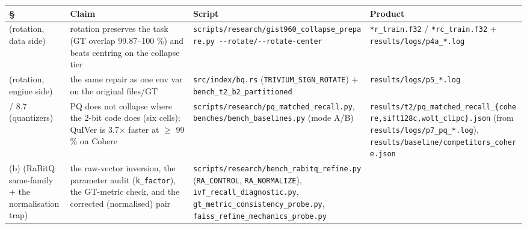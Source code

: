 \documentclass[
  10pt,
]{article}
\newcounter{none} %
\begin{document}
{\def\LTcaptype{none} %
\begin{longtable}[]{@{}
  >{\raggedright\arraybackslash}p{}
  >{\raggedright\arraybackslash}p{}
  >{\raggedright\arraybackslash}p{}
  >{\raggedright\arraybackslash}p{}@{}}
\toprule\noalign{}
\begin{minipage}[b]{\linewidth}\raggedright
§
\end{minipage} & \begin{minipage}[b]{\linewidth}\raggedright
Claim
\end{minipage} & \begin{minipage}[b]{\linewidth}\raggedright
Script
\end{minipage} & \begin{minipage}[b]{\linewidth}\raggedright
Product
\end{minipage} \\
\midrule\noalign{}
\endhead
\bottomrule\noalign{}
\endlastfoot
8.6 (rotation, data side) & rotation preserves the task (GT overlap
99.87--100 \%) and beats centring on the collapse tier &
\texttt{scripts/research/gist960\_collapse\_prepare.py\ -\/-rotate/-\/-rotate-center}
& \texttt{*r\_train.f32} / \texttt{*rc\_train.f32} +
\texttt{results/logs/p4a\_*.log} \\
8.6 (rotation, engine side) & the same repair as one env var on the
original files/GT & \texttt{src/index/bq.rs}
(\texttt{TRIVIUM\_SIGN\_ROTATE}) + \texttt{bench\_t2\_b2\_partitioned} &
\texttt{results/logs/p5\_*.log} \\
5.6 / 8.7 (quantizers) & PQ does not collapse where the 2-bit code does
(six cells); QuIVer is 3.7$\times$ faster at $\geq$ 99 \% on Cohere &
\texttt{scripts/research/pq\_matched\_recall.py},
\texttt{benches/bench\_baselines.py} (mode A/B) &
\texttt{results/t2/pq\_matched\_recall\_\{cohere,sift128c,wolt\_clipc\}.json}
(from \texttt{results/logs/p7\_pq\_*.log}),
\texttt{results/baseline/competitors\_cohere.json} \\
5.6(b) (RaBitQ same-family + the normalisation trap) & the raw-vector
inversion, the parameter audit (\texttt{k\_factor}), the GT-metric
check, and the corrected (normalised) pair &
\texttt{scripts/research/bench\_rabitq\_refine.py}
(\texttt{RA\_CONTROL}, \texttt{RA\_NORMALIZE}),
\texttt{ivf\_recall\_diagnostic.py},
\texttt{gt\_metric\_consistency\_probe.py},
\texttt{faiss\_refine\_mechanics\_probe.py} &

\end{longtable}}
\end{document}
